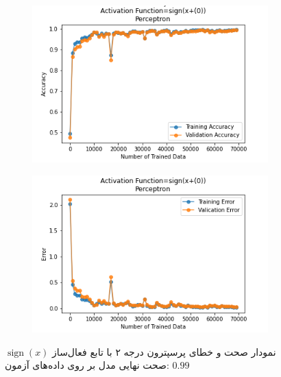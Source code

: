 \documentclass[12pt, a4paper]{article}
\DeclareMathOperator{\sign}{sign}
\begin{document}
\begin{figure}[h]
    \begin{subfigure}{0.45\linewidth}
        \centering
        \includegraphics[width=\linewidth]{images/6/perceptron/activation_func/1.png}
    \end{subfigure}
    \hfil
    \begin{subfigure}{0.45\linewidth}
        \centering
        \includegraphics[width=\linewidth]{images/6/perceptron/activation_func/2.png}
    \end{subfigure}
    \caption{نمودار صحت و خطای پرسپترون درجه ۲ با تابع فعال‌ساز $\sign(x)$
    \newline
    صحت نهایی مدل بر روی داده‌های آزمون: $0.99$}
\end{figure}
\end{document}
